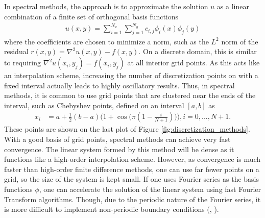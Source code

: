 In spectral methods, the approach is to approximate the solution $u$ as a linear combination of a finite set of orthogonal basis functions
\begin{align}
    u(x,y) = \sum_{i=1}^{N_x} \sum_{j=1}^{N_y} c_{i,j} \phi_{i}(x) \phi_{j}(y)
\end{align}
where the coefficients are chosen to minimize a norm, such as the $L^2$ norm of the residual $r(x,y) = \nabla^2 u(x,y) - f(x,y)$. On a discrete domain, this is similar to requiring $\nabla^2 u(x_i, y_j) = f(x_i, y_j)$ at all interior grid points. As this acts like an interpolation scheme, increasing the number of discretization points on with a fixed interval actually leads to highly oscillatory results. Thus, in spectral methods, it is common to use grid points that are clustered near the ends of the interval, such as Chebyshev points, defined on an interval $[a,b]$ as
\begin{align}
    x_i &= a + \frac{1}{2}(b - a)\Big(1 + \cos \big( \pi (1 - \frac{i}{N + 1}) \big) \Big), i = 0, ..., N + 1.
\end{align}
These points are shown on the last plot of Figure \ref{fig:discretization_methods}. With a good basis of grid points, spectral methods can achieve very fast convergence. The linear system formed by this method will be dense as it functions like a high-order interpolation scheme. However, as convergence is much faster than high-order finite difference methods, one can use far fewer points on a grid, so the size of the system is kept small. If one uses Fourier series as the basis functions $\phi$, one can accelerate the solution of the linear system using fast Fourier Transform algorithms. Though, due to the periodic nature of the Fourier series, it is more difficult to implement non-periodic boundary conditions (\citep{leveque2007finite}, \citep{townsend2015automatic}).

